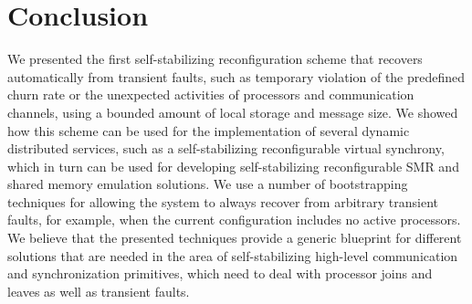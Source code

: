 \documentclass[11pt]{article}
\begin{document}
\section{Conclusion}We presented the first self-stabilizing reconfiguration scheme that recovers automatically from transient faults, such as temporary violation of the predefined churn rate or the unexpected activities of processors and communication channels, using a bounded amount of local storage and message size. We showed how this scheme can be used for the implementation of several dynamic distributed services, such as a self-stabilizing reconfigurable virtual synchrony, which in turn can be used for developing self-stabilizing reconfigurable SMR and shared memory emulation solutions. We use a number of bootstrapping techniques for allowing the system to always recover from arbitrary transient faults, for example, when the current configuration includes no active processors. We believe that the presented techniques provide a generic blueprint for different solutions that
are needed in the area of self-stabilizing high-level communication and synchronization primitives, which need to deal with processor joins and leaves as well as transient faults.
\end{document}
